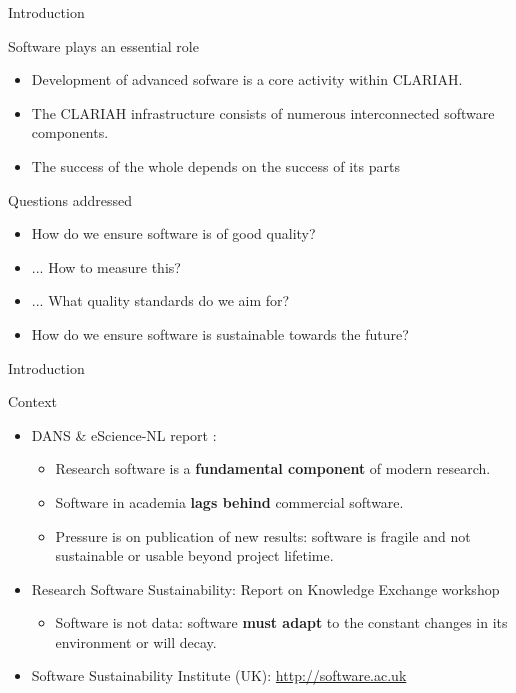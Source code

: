 \documentclass[compress]{beamer}
\begin{document}
\begin{frame}{Introduction}
    \begin{block}{Software plays an essential role}
        \begin{itemize}
            \item Development of advanced sofware is a core activity within CLARIAH.
            \item The CLARIAH infrastructure consists of numerous interconnected software components.
            \item The success of the whole depends on the success of its parts
        \end{itemize}
    \end{block}

    \begin{block}{Questions addressed}
        \begin{itemize}
            \item How do we ensure software is of good quality?
            \item ... How to measure this?
            \item ... What quality standards do we aim for?
            \item How do we ensure software is sustainable towards the future?
        \end{itemize}
    \end{block}

\end{frame}

\begin{frame}{Introduction}
    \begin{block}{Context}
        \begin{itemize}
        \item DANS \& eScience-NL report \citep{RESEARCHSOFTWARE}:
        \begin{itemize}
            \item Research software is a \textbf{fundamental component} of modern research.
            \item Software in academia \textbf{lags behind} commercial software.
            \item Pressure is on publication of new results: software is fragile
                and not sustainable or usable beyond project lifetime.
        \end{itemize}
        \item Research Software Sustainability: Report on Knowledge Exchange workshop
        \begin{itemize}
            \item Software is not data: software \textbf{must adapt} to the constant changes in its environment or will decay.
        \end{itemize}
    \item Software Sustainability Institute (UK): \url{http://software.ac.uk}
        \end{itemize}
    \end{block}
\end{frame}
\end{document}
